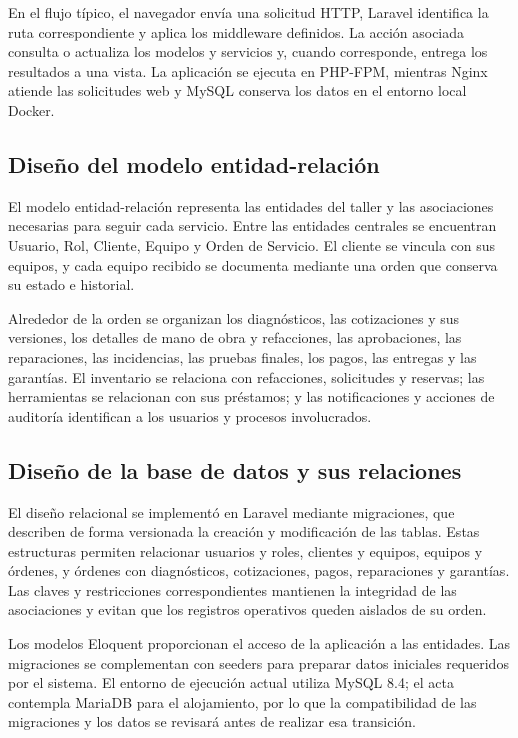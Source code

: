 En el flujo típico, el navegador envía una solicitud HTTP, Laravel identifica la ruta correspondiente y aplica los middleware definidos. La acción asociada consulta o actualiza los modelos y servicios y, cuando corresponde, entrega los resultados a una vista. La aplicación se ejecuta en PHP-FPM, mientras Nginx atiende las solicitudes web y MySQL conserva los datos en el entorno local Docker.

\subsection{Diseño del modelo entidad-relación}

El modelo entidad-relación representa las entidades del taller y las asociaciones necesarias para seguir cada servicio. Entre las entidades centrales se encuentran Usuario, Rol, Cliente, Equipo y Orden de Servicio. El cliente se vincula con sus equipos, y cada equipo recibido se documenta mediante una orden que conserva su estado e historial.

Alrededor de la orden se organizan los diagnósticos, las cotizaciones y sus versiones, los detalles de mano de obra y refacciones, las aprobaciones, las reparaciones, las incidencias, las pruebas finales, los pagos, las entregas y las garantías. El inventario se relaciona con refacciones, solicitudes y reservas; las herramientas se relacionan con sus préstamos; y las notificaciones y acciones de auditoría identifican a los usuarios y procesos involucrados.

\subsection{Diseño de la base de datos y sus relaciones}

El diseño relacional se implementó en Laravel mediante migraciones, que describen de forma versionada la creación y modificación de las tablas. Estas estructuras permiten relacionar usuarios y roles, clientes y equipos, equipos y órdenes, y órdenes con diagnósticos, cotizaciones, pagos, reparaciones y garantías. Las claves y restricciones correspondientes mantienen la integridad de las asociaciones y evitan que los registros operativos queden aislados de su orden.

Los modelos Eloquent proporcionan el acceso de la aplicación a las entidades. Las migraciones se complementan con seeders para preparar datos iniciales requeridos por el sistema. El entorno de ejecución actual utiliza MySQL 8.4; el acta contempla MariaDB para el alojamiento, por lo que la compatibilidad de las migraciones y los datos se revisará antes de realizar esa transición.

